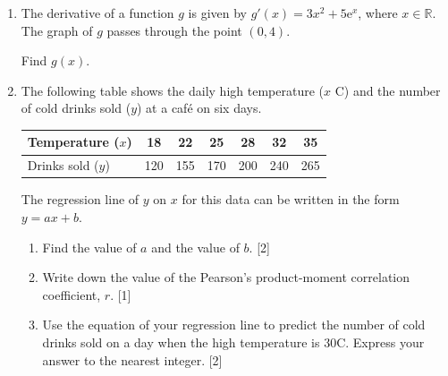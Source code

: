\documentclass[12pt, twoside]{article}
\begin{document}
\begin{enumerate}[itemsep=0.15cm]
\newpage

\item[7.] [Maximum mark: 5]

The derivative of a function $g$ is given by $g'(x) = 3x^{2} + 5\mathrm{e}^{x}$,
where $x \in \mathbb{R}$. The graph of $g$ passes through the point $(0, 4)$.

Find $g(x)$.


\newpage

\item[8.] [Maximum mark: 5]

The following table shows the daily high temperature ($x$ \textdegree C) and the
number of cold drinks sold ($y$) at a caf\'{e} on six days.

\renewcommand{\arraystretch}{1.3}
\begin{center}
\begin{tabular}{|l|c|c|c|c|c|c|}
    \hline
    Temperature ($x$) & 18 & 22 & 25 & 28 & 32 & 35 \\
    \hline
    Drinks sold ($y$) & 120 & 155 & 170 & 200 & 240 & 265 \\
    \hline
\end{tabular}
\end{center}

The regression line of $y$ on $x$ for this data can be written in the form
$y = ax + b$.

\begin{enumerate}[itemsep=0.1cm]
  \item Find the value of $a$ and the value of $b$. \hfill [2]
  \item Write down the value of the Pearson's product-moment correlation
        coefficient, $r$. \hfill [1]
  \item Use the equation of your regression line to predict the number of cold drinks
        sold on a day when the high temperature is 30\textdegree C. Express your
        answer to the nearest integer. \hfill [2]
\end{enumerate}


\end{enumerate}
\end{document}
